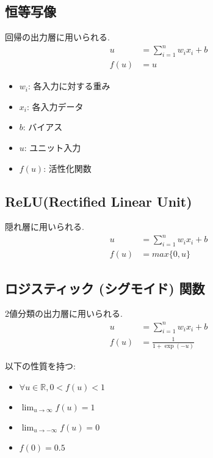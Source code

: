 \documentclass[dvipdfmx, 10pt]{jsarticle}
\begin{document}
\begin{framed}

\subsection*{恒等写像}
回帰の出力層に用いられる. 
\begin{align*}
    u &= \sum_{i=1}^n w_i x_i + b \\
    f(u) &= u
\end{align*}
\begin{itemize}
    \item $w_i$: 各入力に対する重み
    \item $x_i$: 各入力データ
    \item $b$: バイアス
    \item $u$: ユニット入力
    \item $f(u)$: 活性化関数
\end{itemize}

\subsection*{ReLU(Rectified Linear Unit)}
隠れ層に用いられる. 
\begin{align*}
    u &= \sum_{i=1}^n w_i x_i + b \\
    f(u) &= max \{0, u\}
\end{align*}

\subsection*{ロジスティック (シグモイド) 関数}
2値分類の出力層に用いられる. 
\begin{align*}
    u &= \sum_{i=1}^n w_i x_i + b \\
    f(u) &= \frac{1}{1 + \exp(-u)}
\end{align*}

以下の性質を持つ: 
\begin{itemize}
    \item $\forall u \in \mathbb{R}, 0 < f(u) < 1$
    \item $\lim_{u\to \infty} f(u) = 1$
    \item $\lim_{u\to -\infty} f(u) = 0$
    \item $f(0) = 0.5$
\end{itemize}


\end{framed}
\end{document}
